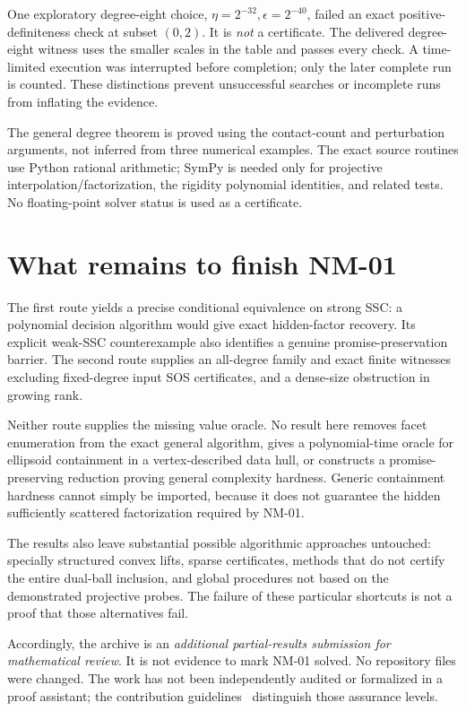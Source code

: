 \documentclass[11pt]{article}
\theoremstyle{definition}\newtheorem{definition}[theorem]{Definition}
\begin{document}
One exploratory degree-eight choice, $\eta=2^{-32},\epsilon=2^{-40}$, failed an exact positive-definiteness check at subset $(0,2)$. It is \emph{not} a certificate. The delivered degree-eight witness uses the smaller scales in the table and passes every check. A time-limited execution was interrupted before completion; only the later complete run is counted. These distinctions prevent unsuccessful searches or incomplete runs from inflating the evidence.

The general degree theorem is proved using the contact-count and perturbation arguments, not inferred from three numerical examples. The exact source routines use Python rational arithmetic; SymPy is needed only for projective interpolation/factorization, the rigidity polynomial identities, and related tests. No floating-point solver status is used as a certificate.

\section{What remains to finish NM-01}
\label{sec:remaining}
The first route yields a precise conditional equivalence on strong SSC: a polynomial decision algorithm would give exact hidden-factor recovery. Its explicit weak-SSC counterexample also identifies a genuine promise-preservation barrier. The second route supplies an all-degree family and exact finite witnesses excluding fixed-degree input SOS certificates, and a dense-size obstruction in growing rank.

Neither route supplies the missing value oracle. No result here removes facet enumeration from the exact general algorithm, gives a polynomial-time oracle for ellipsoid containment in a vertex-described data hull, or constructs a promise-preserving reduction proving general complexity hardness. Generic containment hardness cannot simply be imported, because it does not guarantee the hidden sufficiently scattered factorization required by NM-01.

The results also leave substantial possible algorithmic approaches untouched: specially structured convex lifts, sparse certificates, methods that do not certify the entire dual-ball inclusion, and global procedures not based on the demonstrated projective probes. The failure of these particular shortcuts is not a proof that those alternatives fail.

Accordingly, the archive is an \emph{additional partial-results submission for mathematical review}. It is not evidence to mark NM-01 solved. No repository files were changed. The work has not been independently audited or formalized in a proof assistant; the contribution guidelines~\cite{contrib} distinguish those assurance levels.
\end{document}
